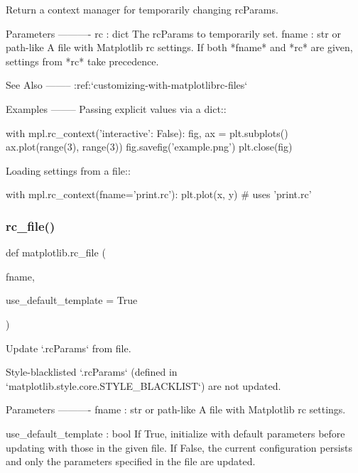 \begin{DoxyVerb}Return a context manager for temporarily changing rcParams.

Parameters
----------
rc : dict
    The rcParams to temporarily set.
fname : str or path-like
    A file with Matplotlib rc settings. If both *fname* and *rc* are given,
    settings from *rc* take precedence.

See Also
--------
:ref:`customizing-with-matplotlibrc-files`

Examples
--------
Passing explicit values via a dict::

    with mpl.rc_context({'interactive': False}):
        fig, ax = plt.subplots()
        ax.plot(range(3), range(3))
        fig.savefig('example.png')
        plt.close(fig)

Loading settings from a file::

     with mpl.rc_context(fname='print.rc'):
         plt.plot(x, y)  # uses 'print.rc'\end{DoxyVerb}
 \mbox{\label{namespacematplotlib_aabe501013cd5d503cbb1aca4e0c0141e}} 
\subsubsection{\texorpdfstring{rc\+\_\+file()}{rc\_file()}}
{\footnotesize\ttfamily def matplotlib.\+rc\+\_\+file (\begin{DoxyParamCaption}\item[{}]{fname,  }\item[{}]{use\+\_\+default\+\_\+template = {\ttfamily True} }\end{DoxyParamCaption})}

\begin{DoxyVerb}Update `.rcParams` from file.

Style-blacklisted `.rcParams` (defined in
`matplotlib.style.core.STYLE_BLACKLIST`) are not updated.

Parameters
----------
fname : str or path-like
    A file with Matplotlib rc settings.

use_default_template : bool
    If True, initialize with default parameters before updating with those
    in the given file. If False, the current configuration persists
    and only the parameters specified in the file are updated.
\end{DoxyVerb}
 \mbox{\label{namespacematplotlib_abab7e1391fed4a96aba56fa0f1ad9fe9}} 
